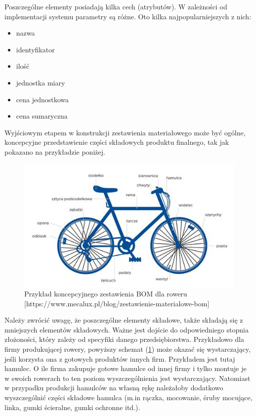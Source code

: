 \documentclass[12pt,twoside]{article}
\begin{document}
Poszczególne elementy posiadają kilka cech (atrybutów). W zależności od implementacji systemu parametry są różne. Oto kilka najpopularniejszych z nich:

\begin{itemize}[label=-,labelsep=0.4cm,leftmargin=0.6cm]
\item nazwa
\item identyfikator
\item ilość
\item jednostka miary
\item cena jednostkowa
\item cena sumaryczna
\end{itemize}

Wyjściowym etapem w konstrukcji zestawienia materiałowego może być ogólne, koncepcyjne przedstawienie części składowych produktu finalnego, tak jak pokazano na przykładzie poniżej.

\begin{figure}[ht]
	\centering
	\includegraphics[width=\textwidth]{figures/examples/bicycle.jpg}
	\caption{Przykład koncepcyjnego zestawienia BOM dla roweru [https://www.mecalux.pl/blog/zestawienie-materialowe-bom]}
\label{fig:example:bicycle}
\end{figure}

Należy zwrócić uwagę, że poszczególne elementy składowe, także składają się z mniejszych elementów składowych. Ważne jest dojście do odpowiedniego stopnia złożoności, który zależy od specyfiki danego przedsiębiorstwa. Przykładowo dla firmy produkującej rowery, powyższy schemat (\ref{fig:example:bicycle}) może okazać się wystarczający, jeśli korzysta ona z gotowych produktów innych firm. Przykładem jest tutaj hamulec. O ile firma zakupuje gotowe hamulce od innej firmy i tylko montuje je w swoich rowerach to ten poziom wyszczególnienia jest wystarczający. Natomiast w przypadku produkcji hamulców na własną rękę należałoby dodatkowo wyszczególnić części składowe hamulca (m.in rączka, mocowanie, śruby mocujące, linka, gumki ścieralne, gumki ochronne itd.).
\end{document}
